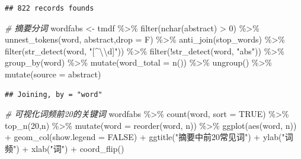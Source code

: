 \documentclass[]{tufte-book}
\newenvironment{Shaded}{}{}
\newcommand{\AttributeTok}[1]{\textcolor[rgb]{0.49,0.56,0.16}{#1}}
\newcommand{\CommentTok}[1]{\textcolor[rgb]{0.38,0.63,0.69}{\textit{#1}}}
\newcommand{\ConstantTok}[1]{\textcolor[rgb]{0.53,0.00,0.00}{#1}}
\newcommand{\DecValTok}[1]{\textcolor[rgb]{0.25,0.63,0.44}{#1}}
\newcommand{\FunctionTok}[1]{\textcolor[rgb]{0.02,0.16,0.49}{#1}}
\newcommand{\NormalTok}[1]{#1}
\newcommand{\OtherTok}[1]{\textcolor[rgb]{0.00,0.44,0.13}{#1}}
\newcommand{\SpecialCharTok}[1]{\textcolor[rgb]{0.25,0.44,0.63}{#1}}
\newcommand{\StringTok}[1]{\textcolor[rgb]{0.25,0.44,0.63}{#1}}
\begin{document}
\begin{verbatim}
## 822 records founds
\end{verbatim}

\begin{Shaded}
\begin{Highlighting}[]
\CommentTok{\# 摘要分词}
\NormalTok{wordfabs }\OtherTok{\textless{}{-}}\NormalTok{ tmdf }\SpecialCharTok{\%\textgreater{}\%}
        \FunctionTok{filter}\NormalTok{(}\FunctionTok{nchar}\NormalTok{(abstract) }\SpecialCharTok{\textgreater{}} \DecValTok{0}\NormalTok{) }\SpecialCharTok{\%\textgreater{}\%}
        \FunctionTok{unnest\_tokens}\NormalTok{(word, abstract,}\AttributeTok{drop =}\NormalTok{ F) }\SpecialCharTok{\%\textgreater{}\%}
        \FunctionTok{anti\_join}\NormalTok{(stop\_words) }\SpecialCharTok{\%\textgreater{}\%}
        \FunctionTok{filter}\NormalTok{(}\FunctionTok{str\_detect}\NormalTok{(word, }\StringTok{"[\^{}}\SpecialCharTok{\textbackslash{}\textbackslash{}}\StringTok{d]"}\NormalTok{)) }\SpecialCharTok{\%\textgreater{}\%}
        \FunctionTok{filter}\NormalTok{(}\SpecialCharTok{!}\FunctionTok{str\_detect}\NormalTok{(word, }\StringTok{"abs"}\NormalTok{)) }\SpecialCharTok{\%\textgreater{}\%}
        \FunctionTok{group\_by}\NormalTok{(word) }\SpecialCharTok{\%\textgreater{}\%}
        \FunctionTok{mutate}\NormalTok{(}\AttributeTok{word\_total =} \FunctionTok{n}\NormalTok{()) }\SpecialCharTok{\%\textgreater{}\%}
        \FunctionTok{ungroup}\NormalTok{() }\SpecialCharTok{\%\textgreater{}\%}
        \FunctionTok{mutate}\NormalTok{(}\AttributeTok{source =} \StringTok{\textquotesingle{}abstract\textquotesingle{}}\NormalTok{)}
\end{Highlighting}
\end{Shaded}

\begin{verbatim}
## Joining, by = "word"
\end{verbatim}

\begin{Shaded}
\begin{Highlighting}[]
\CommentTok{\# 可视化词频前20的关键词}
\NormalTok{wordfabs }\SpecialCharTok{\%\textgreater{}\%}
        \FunctionTok{count}\NormalTok{(word, }\AttributeTok{sort =} \ConstantTok{TRUE}\NormalTok{) }\SpecialCharTok{\%\textgreater{}\%}
        \FunctionTok{top\_n}\NormalTok{(}\DecValTok{20}\NormalTok{,n) }\SpecialCharTok{\%\textgreater{}\%}
        \FunctionTok{mutate}\NormalTok{(}\AttributeTok{word =} \FunctionTok{reorder}\NormalTok{(word, n)) }\SpecialCharTok{\%\textgreater{}\%}
        \FunctionTok{ggplot}\NormalTok{(}\FunctionTok{aes}\NormalTok{(word, n)) }\SpecialCharTok{+}
  \FunctionTok{geom\_col}\NormalTok{(}\AttributeTok{show.legend =} \ConstantTok{FALSE}\NormalTok{) }\SpecialCharTok{+}
  \FunctionTok{ggtitle}\NormalTok{(}\StringTok{"摘要中前20常见词"}\NormalTok{) }\SpecialCharTok{+}
  \FunctionTok{ylab}\NormalTok{(}\StringTok{"词频"}\NormalTok{) }\SpecialCharTok{+}
  \FunctionTok{xlab}\NormalTok{(}\StringTok{"词"}\NormalTok{) }\SpecialCharTok{+}
  \FunctionTok{coord\_flip}\NormalTok{()}
\end{Highlighting}
\end{Shaded}
\end{document}
